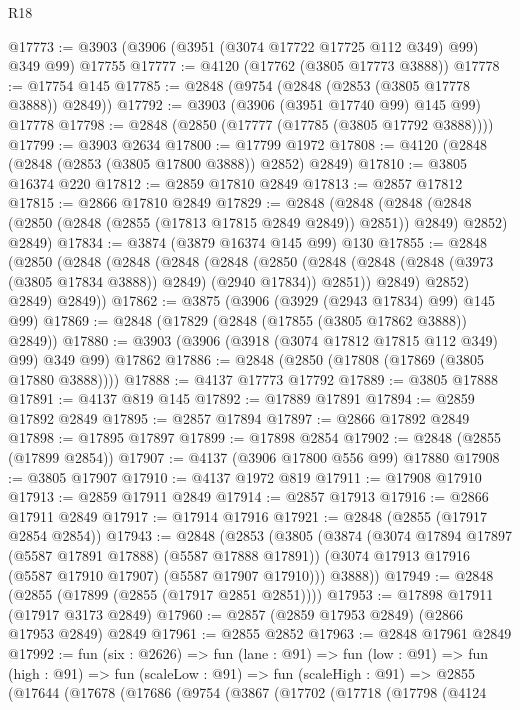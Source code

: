 \begin{lexlean}{R18}
\begin{coremodule}
@17773 := @3903 (@3906 (@3951 (@3074 @17722 @17725 @112 @349) @99) @349 @99) @17755
@17777 := @4120 (@17762 (@3805 @17773 @3888))
@17778 := @17754 @145
@17785 := @2848 (@9754 (@2848 (@2853 (@3805 @17778 @3888)) @2849))
@17792 := @3903 (@3906 (@3951 @17740 @99) @145 @99) @17778
@17798 := @2848 (@2850 (@17777 (@17785 (@3805 @17792 @3888))))
@17799 := @3903 @2634
@17800 := @17799 @1972
@17808 := @4120 (@2848 (@2848 (@2853 (@3805 @17800 @3888)) @2852) @2849)
@17810 := @3805 @16374 @220
@17812 := @2859 @17810 @2849
@17813 := @2857 @17812
@17815 := @2866 @17810 @2849
@17829 := @2848
    (@2848
      (@2848 (@2848 (@2850 (@2848 (@2855 (@17813 @17815 @2849 @2849)) @2851)) @2849) @2852)
      @2849)
@17834 := @3874 (@3879 @16374 @145 @99) @130
@17855 := @2848
    (@2850
      (@2848
        (@2848
          (@2848
            (@2848
              (@2850
                (@2848 (@2848 (@2848 (@3973 (@3805 @17834 @3888)) @2849) (@2940 @17834)) @2851))
              @2849)
            @2852)
          @2849)
        @2849))
@17862 := @3875 (@3906 (@3929 (@2943 @17834) @99) @145 @99)
@17869 := @2848 (@17829 (@2848 (@17855 (@3805 @17862 @3888)) @2849))
@17880 := @3903 (@3906 (@3918 (@3074 @17812 @17815 @112 @349) @99) @349 @99) @17862
@17886 := @2848 (@2850 (@17808 (@17869 (@3805 @17880 @3888))))
@17888 := @4137 @17773 @17792
@17889 := @3805 @17888
@17891 := @4137 @819 @145
@17892 := @17889 @17891
@17894 := @2859 @17892 @2849
@17895 := @2857 @17894
@17897 := @2866 @17892 @2849
@17898 := @17895 @17897
@17899 := @17898 @2854
@17902 := @2848 (@2855 (@17899 @2854))
@17907 := @4137 (@3906 @17800 @556 @99) @17880
@17908 := @3805 @17907
@17910 := @4137 @1972 @819
@17911 := @17908 @17910
@17913 := @2859 @17911 @2849
@17914 := @2857 @17913
@17916 := @2866 @17911 @2849
@17917 := @17914 @17916
@17921 := @2848 (@2855 (@17917 @2854 @2854))
@17943 := @2848
    (@2853
      (@3805
        (@3874
          (@3074 @17894 @17897 (@5587 @17891 @17888) (@5587 @17888 @17891))
          (@3074 @17913 @17916 (@5587 @17910 @17907) (@5587 @17907 @17910)))
        @3888))
@17949 := @2848 (@2855 (@17899 (@2855 (@17917 @2851 @2851))))
@17953 := @17898 @17911 (@17917 @3173 @2849)
@17960 := @2857 (@2859 @17953 @2849) (@2866 @17953 @2849) @2849
@17961 := @2855 @2852
@17963 := @2848 @17961 @2849
@17992 := fun (six : @2626) =>
  fun (lane : @91) =>
  fun (low : @91) =>
  fun (high : @91) =>
  fun (scaleLow : @91) =>
  fun (scaleHigh : @91) =>
  @2855
    (@17644
      (@17678
        (@17686
          (@9754
            (@3867
              (@17702
                (@17718
                  (@17798
                    (@4124

\end{coremodule}
\end{lexlean}
